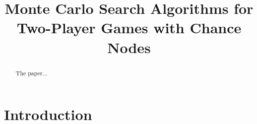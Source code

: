 \documentclass[jair,twoside,11pt,theapa]{article}
\begin{document}
\title{Monte Carlo Search Algorithms for Two-Player Games with Chance Nodes}

\author{}



\maketitle

\begin{abstract}
The paper...
\end{abstract}

\section{Introduction}
\label{sec:intro}

\cite{Lanctot13MCMS}







\vskip 0.2in


\end{document}
